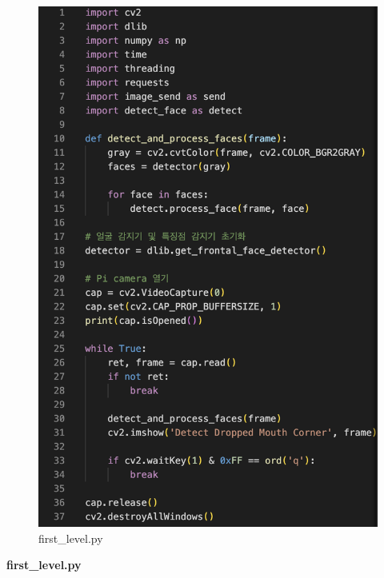 \begin{figure}[h]
    \centering
\includegraphics[width=0.5\linewidth]{images/first_level.png}
    \caption{first\_level.py}
    \label{fig:enter-label}
\end{figure}

\textbf{first\_level.py}

